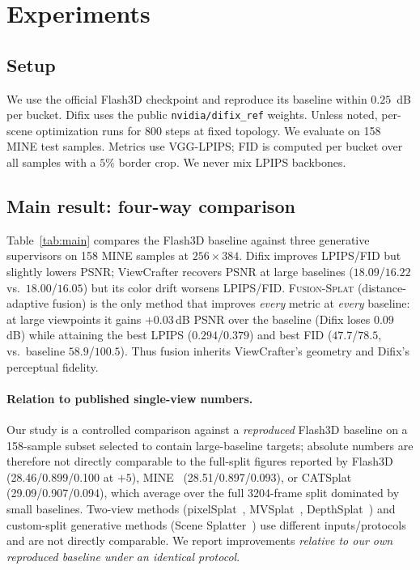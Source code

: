 \documentclass[10pt,twocolumn,letterpaper]{article}
\newcommand{\method}{\textsc{Fusion-Splat}}
\begin{document}
\section{Experiments}
\label{sec:exp}

\subsection{Setup}
We use the official Flash3D checkpoint and reproduce its baseline within
$0.25$~dB per bucket. Difix uses the public \texttt{nvidia/difix\_ref} weights.
Unless noted, per-scene optimization runs for 800 steps at fixed topology. We
evaluate on 158 MINE test samples. Metrics use VGG-LPIPS; FID is computed per
bucket over all samples with a $5\%$ border crop. We never mix LPIPS backbones.

\subsection{Main result: four-way comparison}
Table~\ref{tab:main} compares the Flash3D baseline against three generative
supervisors on 158 MINE samples at $256{\times}384$. Difix improves LPIPS/FID
but slightly lowers PSNR; ViewCrafter recovers PSNR at large baselines
($18.09$/$16.22$ vs.\ $18.00$/$16.05$) but its color drift worsens LPIPS/FID.
\method{} (distance-adaptive fusion) is the only method that improves
\emph{every} metric at \emph{every} baseline: at large viewpoints it gains
$+0.03$\,dB PSNR over the baseline (Difix loses $0.09$\,dB) while attaining the
best LPIPS ($0.294$/$0.379$) and best FID ($47.7$/$78.5$, vs.\ baseline
$58.9$/$100.5$). Thus fusion inherits ViewCrafter's geometry and Difix's
perceptual fidelity.

\paragraph{Relation to published single-view numbers.}
Our study is a controlled comparison against a \emph{reproduced} Flash3D
baseline on a 158-sample subset selected to contain large-baseline targets;
absolute numbers are therefore not directly comparable to the full-split figures
reported by Flash3D~\cite{flash3d} (28.46/0.899/0.100 at $+5$),
MINE~\cite{mine} (28.51/0.897/0.093), or CATSplat~\cite{catsplat}
(29.09/0.907/0.094), which average over the full 3204-frame split dominated by
small baselines. Two-view methods (pixelSplat~\cite{pixelsplat},
MVSplat~\cite{mvsplat}, DepthSplat~\cite{depthsplat}) and custom-split generative
methods (Scene Splatter~\cite{scenesplatter}) use different inputs/protocols and
are not directly comparable. We report improvements \emph{relative to our own
reproduced baseline under an identical protocol}.
\end{document}
